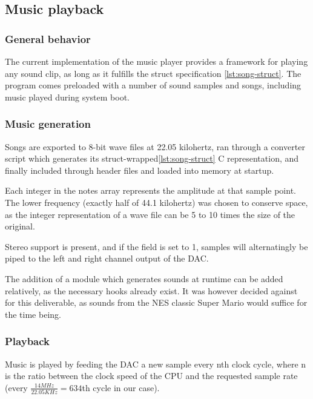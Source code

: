 \subsection{Music playback}

\subsubsection{General behavior}

The current implementation of the music player provides a framework for playing any sound clip, as long as it fulfills the struct specification \ref{lst:song-struct}.
The program comes preloaded with a number of sound samples and songs, including music played during system boot.


\subsubsection{Music generation}

Songs are exported to 8-bit wave files at 22.05 kilohertz,
ran through a converter script which generates its struct-wrapped\ref{lst:song-struct} C
representation, and finally included through header files and loaded into memory at startup.



Each integer in the notes array represents the amplitude at that sample point.
The lower frequency (exactly half of 44.1 kilohertz) was chosen to conserve space, as the integer representation of a wave file can be 5 to 10 times the size of the original.

Stereo support is present, and if the field is set to 1, samples will alternatingly be piped to the left and right channel output of the DAC.

The addition of a module which generates sounds at runtime can be added relatively, as the necessary hooks already exist. It was however decided against for this deliverable, as sounds from the NES classic Super Mario would suffice for the time being.

\subsubsection{Playback}

Music is played by feeding the DAC a new sample every nth clock cycle, where n is the ratio between the clock speed of the CPU and the requested sample rate (every $ \frac{14 MHz}{22.05 KHz} = 634 $th cycle in our case).

